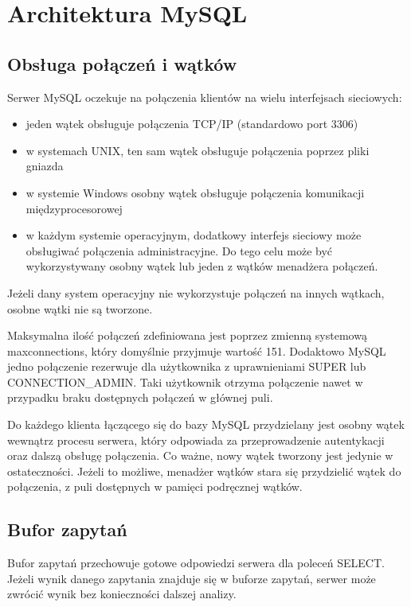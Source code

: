 \section{Architektura MySQL}

\subsection{Obsługa połączeń i wątków}
Serwer MySQL oczekuje na połączenia klientów na wielu interfejsach sieciowych:
\begin{itemize}
\item jeden wątek obsługuje połączenia TCP/IP (standardowo port 3306)
\item w systemach UNIX, ten sam wątek obsługuje połączenia poprzez pliki gniazda
\item w systemie Windows osobny wątek obsługuje połączenia komunikacji międzyprocesorowej
\item w każdym systemie operacyjnym, dodatkowy interfejs sieciowy może obsługiwać połączenia administracyjne. Do tego celu może być wykorzystywany osobny wątek lub jeden z wątków menadżera połączeń.
\end{itemize}

Jeżeli dany system operacyjny nie wykorzystuje połączeń na innych wątkach, osobne wątki nie są tworzone.

Maksymalna ilość połączeń zdefiniowana jest poprzez zmienną systemową max\textunderscore connections, który domyślnie przyjmuje wartość 151. Dodaktowo MySQL jedno połączenie rezerwuje dla użytkownika z uprawnieniami SUPER lub \newline CONNECTION\_ADMIN. Taki użytkownik otrzyma połączenie nawet w przypadku braku dostępnych połączeń w głównej puli.

Do każdego klienta łączącego się do bazy MySQL przydzielany jest osobny wątek wewnątrz procesu serwera, który odpowiada za przeprowadzenie autentykacji oraz dalszą obsługę połączenia. Co ważne, nowy wątek tworzony jest jedynie w ostateczności. Jeżeli to możliwe, menadżer wątków stara się przydzielić wątek do połączenia, z puli dostępnych w pamięci podręcznej wątków.

\subsection{Bufor zapytań}
Bufor zapytań przechowuje gotowe odpowiedzi serwera dla poleceń SELECT. Jeżeli wynik danego zapytania znajduje się w buforze zapytań, serwer może zwrócić wynik bez konieczności dalszej analizy.

